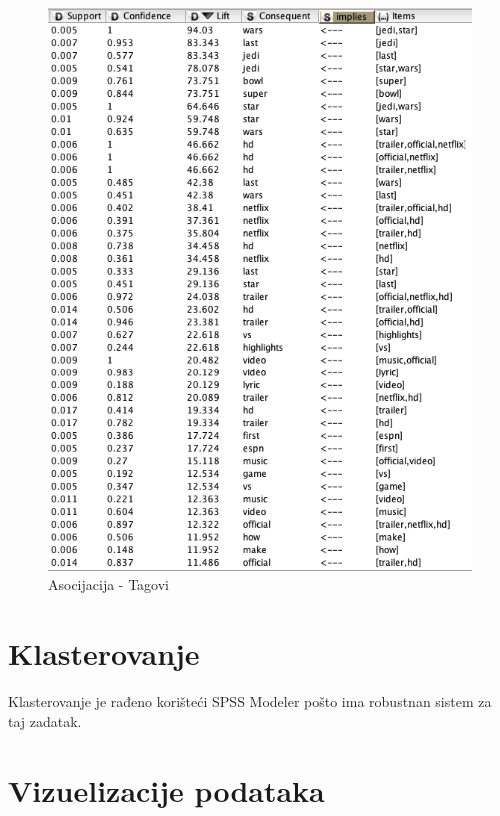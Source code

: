 \documentclass[a4paper]{article}
\theoremstyle{definition}
\begin{document}
\begin{figure}[H]
\begin{center}
    \includegraphics[width=1\textwidth]{association2.png}
    \caption{Asocijacija - Tagovi}
     \label{fig:asoc2}
\end{center}
\end{figure}

\section{Klasterovanje}
\label{sec:dod}

Klasterovanje je rađeno korišteći SPSS Modeler pošto ima robustnan sistem za taj zadatak.

\section{Vizuelizacije podataka}
\label{sec:dod}
\end{document}
